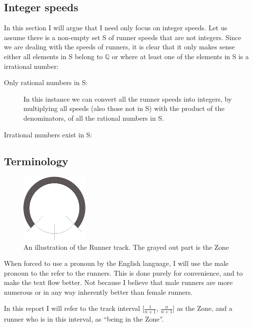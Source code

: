 \subsection{Integer speeds}
In this section I will argue that I need only focus on integer speeds.
Let us assume there is a non-empty set S of runner speeds that are not integers. Since we are dealing with the speeds of runners, it is clear that it only makes sense either all elements in S belong to $\mathbb{Q}$ or where at least one of the elements in S is a irrational number:
\begin{description}
\item[Only rational numbers in S:] In this instance we can convert all the runner speeds into integers, by multiplying all speeds (also those not in S) with the product of the denominators, of all the rational numbers in S.
\item[Irrational numbers exist in S:]   
\end{description}

\subsection{Terminology}
\label{Termonolgy}
\begin{figure}[H]
  \centering
  \includegraphics[width=0.3\textwidth]{./images/circleZoneEPS}
  \caption{\label{circleZoneImg}An illustration of the Runner track. The grayed out part is the Zone}
\end{figure}

When forced to use a pronoun by the English language, I will use the male pronoun to the refer to the runners. This is done purely for convenience, and to make the text flow better. Not because I believe that male runners are more numerous or in any way inherently better than female runners.

\begin{defi}
\label{def:theZone}
In this report I will refer to the track interval [$\frac{1}{n + 1}$, $\frac{n}{n+1}$] as the Zone, and a runner who is in this interval, as ``being in the Zone''.
\end{defi}

